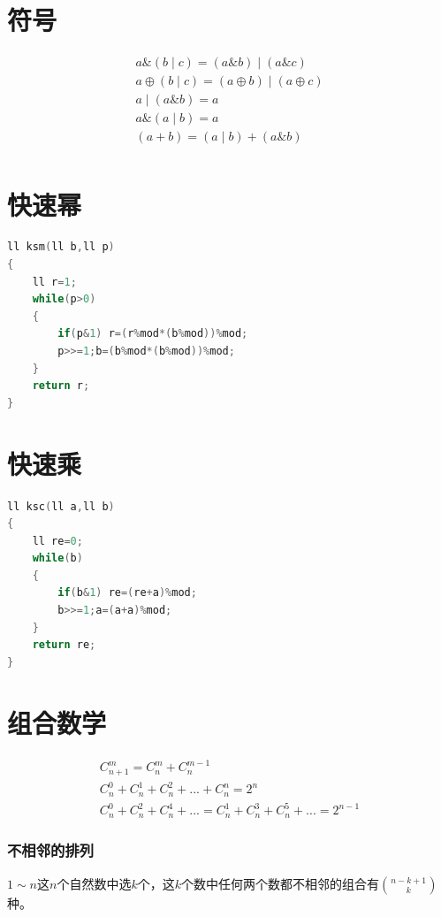 \documentclass[a4paper]{book}
\begin{document}
\fi

\section{符号}

\begin{gather*}
    a \& (b\mid c) = (a\&b)\mid(a\&c)\\
    a \oplus (b\mid c) = (a\oplus b)\mid(a\oplus c)\\
    a\mid (a\&b) = a\\
    a\&(a\mid b) = a\\
    (a+b) = (a\mid b)+(a\&b)\\
\end{gather*}

\section{快速幂}
\begin{lstlisting}[language=C++]
ll ksm(ll b,ll p)
{
    ll r=1;
    while(p>0)
    {
        if(p&1) r=(r%mod*(b%mod))%mod;
        p>>=1;b=(b%mod*(b%mod))%mod;
    }
    return r;
}
\end{lstlisting}

\section{快速乘}
\begin{lstlisting}[language=C++]
ll ksc(ll a,ll b) 
{
	ll re=0;
	while(b) 
	{
		if(b&1)	re=(re+a)%mod;
		b>>=1;a=(a+a)%mod;
	}
	return re;
}
\end{lstlisting}

\section{组合数学}

\begin{gather*}
    C_{n+1}^{m} = C_{n} ^ {m} + C_{n} ^ {m-1}\\
    C_{n} ^ {0} + C_{n} ^ {1} + C_{n} ^ {2} + ... + C_{n} ^ {n} =2 ^ n\\
    C_{n} ^ {0} + C_{n} ^ {2} + C_{n} ^ {4} +... = C_{n} ^ {1} + C_{n} ^ {3} + C_{n} ^ {5} + ... = 2^{n-1}
\end{gather*}
\subsubsection{不相邻的排列}
$1\sim n$这$n$个自然数中选$k$个，这$k$个数中任何两个数都不相邻的组合有$\binom{n-k+1}{k}$种。
\end{document}
